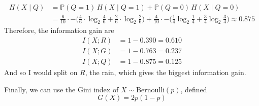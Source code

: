 \documentclass{article}
\begin{document}
\begin{example}
\begin{align*}
          H(X \mid Q ) & = \mathbb{P}(Q = 1)\, H(X \mid Q = 1) + \mathbb{P}(Q = 0) \, H(X \mid Q = 0) \\
          & = \frac{6}{10} \cdot - \big( \frac{4}{6} \cdot \log_2 \frac{4}{6} + \frac{2}{6} \cdot \log_2 \frac{2}{6} \big) + \frac{4}{10} \cdot - \big( \frac{1}{4} \log_2 \frac{1}{4} + \frac{3}{4} \log_2 \frac{3}{4} \big) \approx 0.875
      \end{align*}
      Therefore, the information gain are 
      \begin{align*}
          I(X; R) & = 1 - 0.390 = 0.610 \\
          I(X; G) & = 1 - 0.763 = 0.237 \\
          I(X; Q) & = 1 - 0.875 = 0.125 
      \end{align*}
      And so I would split on $R$, the rain, which gives the biggest information gain. 
    \end{example}

    Finally, we can use the Gini index of $X \sim \mathrm{Bernoulli}(p)$, defined 
    \begin{equation}
      G(X) = 2 p (1 - p)
    \end{equation}
\end{document}
